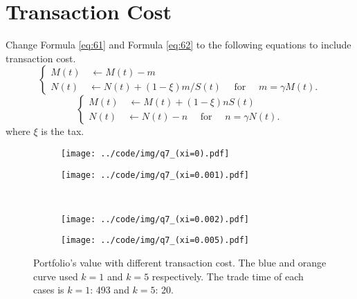 \documentclass[runningheads]{llncs}
\begin{document}
\section{Transaction Cost}\label{sec:7}

Change Formula \ref{eq:61} and Formula \ref{eq:62} to the following equations to include transaction cost.
\begin{equation}
    \left\{\begin{array}{l}
        M(t) \quad \leftarrow M(t)-m \\
        N(t) \quad \leftarrow N(t)+(1-\xi)m / S(t) \quad \text { for } \quad m=\gamma M(t) .
    \end{array}\right.
\end{equation}
\begin{equation}
    \left\{\begin{array}{l}
        M(t) \quad \leftarrow M(t)+(1-\xi)n S(t) \\
        N(t) \quad \leftarrow N(t)-n  \quad \text { for } \quad n=\gamma N(t) .
    \end{array}\right.
\end{equation}
where $\xi$ is the tax.



\begin{figure}[!htbp]
    \begin{subfigure}[t]{0.49\textwidth}
        \centering
        \texttt{[image: ../code/img/q7\_(xi=0).pdf]}
    \end{subfigure}
    \begin{subfigure}[t]{0.49\textwidth}
        \centering
        \texttt{[image: ../code/img/q7\_(xi=0.001).pdf]}
    \end{subfigure}
    ~
    \begin{subfigure}[t]{0.49\textwidth}
        \centering
        \texttt{[image: ../code/img/q7\_(xi=0.002).pdf]}
    \end{subfigure}
    \begin{subfigure}[t]{0.49\textwidth}
        \centering
        \texttt{[image: ../code/img/q7\_(xi=0.005).pdf]}
    \end{subfigure}
    \caption{Portfolio's value with different transaction cost. The blue and orange curve used $k=1$ and $k=5$ respectively. The trade time of each cases is $k=1$: 493 and $k=5$: 20.}
    \label{fig:q7}
\end{figure}
\end{document}
